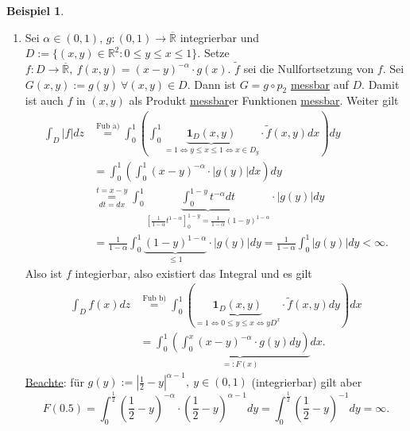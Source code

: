 \documentclass[a4paper]{report}
\newcommand{\doubleOne}{\textbf{1}}
\newcommand{\R}{\mathbb{R}}
\newcommand{\Rq}{\overline{\R}}
\newcommand{\jlabel}[1]{\label{j_#1}}
\newcommand{\jhyperref}[2]{\hyperref[j_#1]{#2}}
\newcommand{\jlink}[1]{\jhyperref{#1}{#1}}
\newcommand{\jabb}[3]{ #1: #2 \rightarrow #3 }
\newcommand{\jshortlinkFubiniA}{\jhyperref{FubiniA}{\text{Fub a)}}}
\newcommand{\jshortlinkFubiniB}{\jhyperref{FubiniB}{\text{Fub b)}}}
\newcommand{\jspacesmall}{\vspace{4pt}}
\newcommand{\jdate}[1]{\jspacesmall\begin{center}\jlabel{#1}\tiny{Ana III, #1}\end{center}}
\theoremstyle{plain}
\theoremstyle{definition}
\newtheorem*{expl*}{Beispiel}
\begin{document}
{{{{\begin{expl*}
\begin{enumerate}
\jdate{15.12.2008}

        \item 
            Sei $\alpha \in (0,1)$, $\jabb{g}{(0,1)}{\Rq}$ integrierbar und $D:=\{(x,y)\in \R^2 : 0 \le y \le x \le 1\}$. Setze $\jabb{f}{D}{\Rq}, \ f(x,y) = (x-y)^{-\alpha}\cdot g(x)$. $\tilde{f}$ sei die Nullfortsetzung von $f$. Sei $G(x,y):=g(y) \ \forall (x,y)\in D$. Dann ist $G = g\circ p_2$ \jlink{messbar} auf $D$. Damit ist auch $f$ in $(x,y)$ als Produkt \jlink{messbar}er Funktionen \jlink{messbar}. Weiter gilt
            \begin{displaymath}
                \begin{split}
                    \int_D |f| dz &\overset{\jshortlinkFubiniA}{=} \int_0^1 \left( \int_0^1 \underbrace{\doubleOne_D(x,y)}_{=1 \Leftrightarrow y \le x \le 1 \Leftrightarrow x\in D_y} \cdot \tilde{f}(x,y) dx \right)dy\\
                    &= \int_0^1 \left ( \int_0^1 (x-y)^{-\alpha} \cdot |g(y)| dx \right) dy\\
                    &\underset{dt=dx}{\overset{t=x-y}{=}} \int_0^1 \underbrace{\int_0^{1-y} t^{-\alpha}dt}_{\left [\frac{1}{1-\alpha} t^{1-\alpha} \right]_0^{1-y} = \frac{1}{1-\alpha}(1-y)^{1-\alpha}} \cdot |g(y)| dy\\
                    &= \frac{1}{1-\alpha} \int_0^1 \underbrace{(1-y)^{1-\alpha}}_{\le 1} \cdot |g(y)| dy = \frac{1}{1-\alpha} \int_0^1 |g(y)|dy < \infty.
                \end{split}
            \end{displaymath}
            Also ist $f$ integierbar, also existiert das Integral und es gilt
            \begin{displaymath}
                \begin{split}
                    \int_D f(x)dz &\overset{\jshortlinkFubiniB}{=} \int_0^1\left ( \underbrace{\doubleOne_D(x,y)}_{=1 \Leftrightarrow 0 \le y \le x \Leftrightarrow y D^x}\cdot \tilde{f}(x,y)dy \right )dx\\
                    &=\int_0^1 \underbrace{\left( \int_0^x (x-y)^{-\alpha} \cdot g(y) dy\right)}_{=: F(x)}dx.
                \end{split}
            \end{displaymath}
            \underline{Beachte}: für $g(y) := |\frac{1}{2}-y|^{\alpha-1},\ y \in (0,1)$ (integrierbar) gilt aber
            \begin{displaymath}
                F(0.5) = \int_0^{\frac{1}{2}} \left(\frac{1}{2}-y \right)^{-\alpha} \cdot \left(\frac{1}{2}-y \right)^{\alpha-1} dy = \int_0^{\frac{1}{2}} \left(\frac{1}{2}-y \right)^{-1} dy = \infty.
            \end{displaymath}


\end{enumerate}
\end{expl*}}}}}
\end{document}
